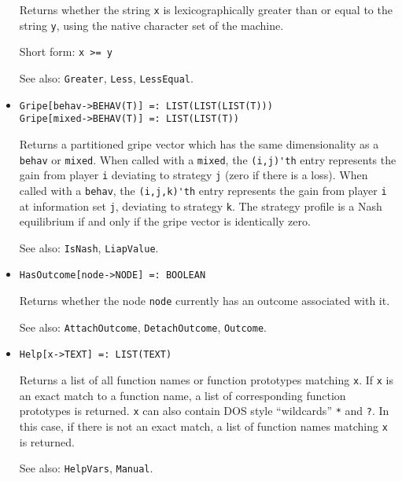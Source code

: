 \begin{itemize}
\bd
Returns whether the string \verb+x+ is lexicographically greater than
or equal to the string \verb+y+, using the native character set of the
machine.
\item
[Short form:] \verb+x >= y+
\item
[See also:] {\tt Greater}, {\tt Less}, {\tt LessEqual}.
\ed

\item
\protect \large \begin{verbatim}
Gripe[behav->BEHAV(T)] =: LIST(LIST(LIST(T)))
Gripe[mixed->BEHAV(T)] =: LIST(LIST(T))
\end{verbatim}\normalsize

\bd 
Returns a partitioned gripe vector which has the same
dimensionality as a \verb+behav+ or \verb+mixed+.  When called with a
\verb+mixed+, the \verb+(i,j)'th+ entry represents the gain from
player \verb+i+ deviating to strategy \verb+j+ (zero if there is a
loss).  When called with a \verb+behav+, the \verb+(i,j,k)'th+ entry
represents the gain from player \verb+i+ at information set \verb+j+,
deviating to strategy \verb+k+.  The strategy profile is a Nash
equilibrium if and only if the gripe vector is identically zero.  
\item
[See also:] {\tt IsNash}, {\tt LiapValue}.  
\ed



\item
\protect \large \begin{verbatim}
HasOutcome[node->NODE] =: BOOLEAN
\end{verbatim} \normalsize

\bd
Returns whether the node \verb+node+ currently has an outcome associated
with it.
\item
[See also:] {\tt AttachOutcome}, {\tt DetachOutcome}, {\tt Outcome}.
\ed

\item
\protect \large \begin{verbatim}
Help[x->TEXT] =: LIST(TEXT)
\end{verbatim}\normalsize

\bd 
Returns a list of all function names or function prototypes
matching \verb+x+.  If \verb+x+ is an exact match to a function name,
a list of corresponding function prototypes is returned.  \verb+x+ can
also contain DOS style ``wildcards'' \verb+*+ and \verb+?+.  In this
case, if there is not an exact match, a list of function names
matching \verb+x+ is returned.
\item
[See also:] {\tt HelpVars}, {\tt Manual}.  
\ed


\end{itemize}
